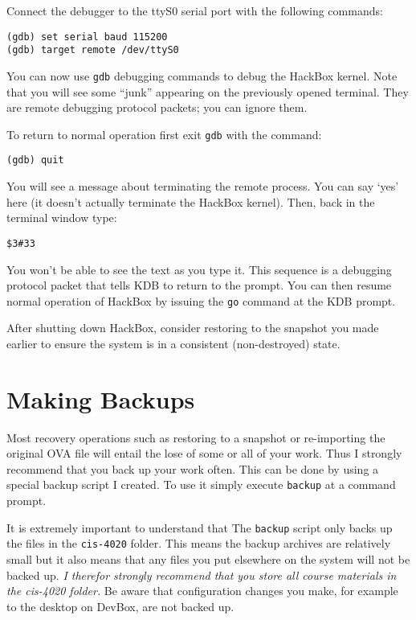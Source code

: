 \documentclass[twocolumn]{article}
\newcommand{\command}[1]{\texttt{#1}}
\begin{document}
Connect the debugger to the ttyS0 serial port with the following commands:
\begin{Verbatim}
(gdb) set serial baud 115200
(gdb) target remote /dev/ttyS0
\end{Verbatim}

You can now use \texttt{gdb} debugging commands to debug the HackBox kernel. Note that you will
see some ``junk'' appearing on the previously opened terminal. They are remote debugging
protocol packets; you can ignore them.

To return to normal operation first exit \texttt{gdb} with the command:
\begin{Verbatim}
(gdb) quit
\end{Verbatim}
You will see a message about terminating the remote process. You can say `yes' here (it doesn't
actually terminate the HackBox kernel). Then, back in the terminal window type:
\begin{Verbatim}
$3#33
\end{Verbatim}
You won't be able to see the text as you type it. This sequence is a debugging protocol packet
that tells KDB to return to the prompt. You can then resume normal operation of HackBox by
issuing the \command{go} command at the KDB prompt.

After shutting down HackBox, consider restoring to the snapshot you made earlier to ensure the
system is in a consistent (non-destroyed) state.

\section{Making Backups}

Most recovery operations such as restoring to a snapshot or re-importing the original OVA file
will entail the lose of some or all of your work. Thus I strongly recommend that you back up
your work often. This can be done by using a special backup script I created. To use it simply
execute \texttt{backup} at a command prompt.

It is extremely important to understand that The \texttt{backup} script only backs up the files
in the \texttt{cis-4020} folder. This means the backup archives are relatively small but it also
means that any files you put elsewhere on the system will not be backed up. \emph{I therefor
  strongly recommend that you store all course materials in the cis-4020 folder.} Be aware that
configuration changes you make, for example to the desktop on DevBox, are not backed up.
\end{document}
